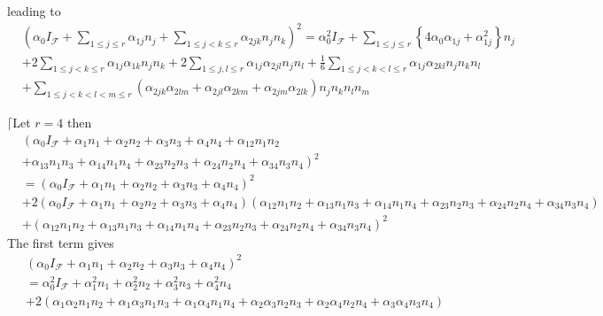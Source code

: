 \documentclass[aps,preprint]{revtex4}%
\begin{document}
leading to
\begin{align}
&  \left(  \alpha_{0}I_{\mathcal{F}}+\sum_{1\leq j\leq r}\alpha_{1j}n_{j}%
+\sum_{1\leq j<k\leq r}\alpha_{2jk}n_{j}n_{k}\right)  ^{2}=\alpha_{0}%
^{2}I_{\mathcal{F}}+\sum_{1\leq j\leq r}\left\{  4\alpha_{0}\alpha_{1j}%
+\alpha_{1j}^{2}\right\}  n_{j}\nonumber\\
&  +2\sum_{1\leq j<k\leq r}\alpha_{1j}\alpha_{1k}n_{j}n_{k}+2\sum_{1\leq
j,l\leq r}\alpha_{1j}\alpha_{2jl}n_{j}n_{l}+\frac{1}{6}\sum_{1\leq j<k<l\leq
r}\alpha_{1j}\alpha_{2kl}n_{j}n_{k}n_{l}\nonumber\\
&  +\sum_{1\leq j<k<l<m\leq r}\left(  \alpha_{2jk}\alpha_{2lm}+\alpha
_{2jl}\alpha_{2km}+\alpha_{2jm}\alpha_{2lk}\right)  n_{j}n_{k}n_{l}n_{m}%
\end{align}


$\lceil$Let $r=4$ then
\begin{align}
&  \left(  \alpha_{0}I_{\mathcal{F}}+\alpha_{1}n_{1}+\alpha_{2}n_{2}%
+\alpha_{3}n_{3}+\alpha_{4}n_{4}+\alpha_{12}n_{1}n_{2}\right. \nonumber\\
&  +\left.  \alpha_{13}n_{1}n_{3}+\alpha_{14}n_{1}n_{4}+\alpha_{23}n_{2}%
n_{3}+\alpha_{24}n_{2}n_{4}+\alpha_{34}n_{3}n_{4}\right)  ^{2}\nonumber\\
&  =\left(  \alpha_{0}I_{\mathcal{F}}+\alpha_{1}n_{1}+\alpha_{2}n_{2}%
+\alpha_{3}n_{3}+\alpha_{4}n_{4}\right)  ^{2}\nonumber\\
&  +2\left(  \alpha_{0}I_{\mathcal{F}}+\alpha_{1}n_{1}+\alpha_{2}n_{2}%
+\alpha_{3}n_{3}+\alpha_{4}n_{4}\right)  \left(  \alpha_{12}n_{1}n_{2}%
+\alpha_{13}n_{1}n_{3}+\alpha_{14}n_{1}n_{4}+\alpha_{23}n_{2}n_{3}+\alpha
_{24}n_{2}n_{4}+\alpha_{34}n_{3}n_{4}\right) \nonumber\\
&  +\left(  \alpha_{12}n_{1}n_{2}+\alpha_{13}n_{1}n_{3}+\alpha_{14}n_{1}%
n_{4}+\alpha_{23}n_{2}n_{3}+\alpha_{24}n_{2}n_{4}+\alpha_{34}n_{3}%
n_{4}\right)  ^{2}%
\end{align}
The first term gives
\begin{align}
&  \left(  \alpha_{0}I_{\mathcal{F}}+\alpha_{1}n_{1}+\alpha_{2}n_{2}%
+\alpha_{3}n_{3}+\alpha_{4}n_{4}\right)  ^{2}\nonumber\\
&  =\alpha_{0}^{2}I_{\mathcal{F}}+\alpha_{1}^{2}n_{1}+\alpha_{2}^{2}%
n_{2}+\alpha_{3}^{2}n_{3}+\alpha_{4}^{2}n_{4}\nonumber\\
&  +2\left(  \alpha_{1}\alpha_{2}n_{1}n_{2}+\alpha_{1}\alpha_{3}n_{1}%
n_{3}+\alpha_{1}\alpha_{4}n_{1}n_{4}+\alpha_{2}\alpha_{3}n_{2}n_{3}+\alpha
_{2}\alpha_{4}n_{2}n_{4}+\alpha_{3}\alpha_{4}n_{3}n_{4}\right)
\end{align}
\end{document}
